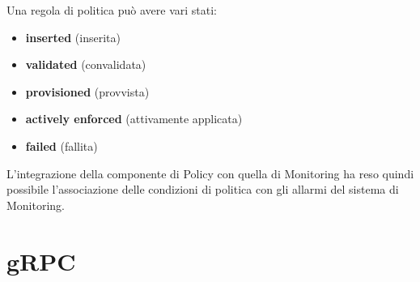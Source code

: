 Una regola di politica può avere vari stati:
\begin{itemize}
    \item \textbf{inserted} (inserita)
    \item \textbf{validated} (convalidata)
    \item \textbf{provisioned} (provvista)
    \item \textbf{actively enforced} (attivamente applicata)
    \item \textbf{failed} (fallita)
\end{itemize}
L'integrazione della componente di Policy con quella di Monitoring ha reso quindi possibile l'associazione delle condizioni di politica con gli allarmi del sistema di Monitoring.



\section{gRPC} \label{grpc}

